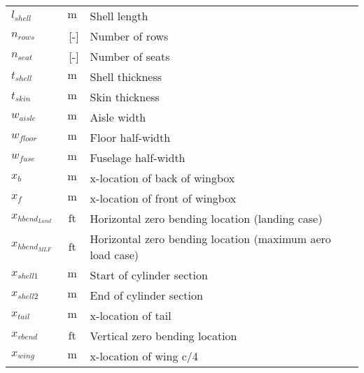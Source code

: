 \documentclass[12pt]{article}
\begin{document}
{\begin{supertabular}{lcl}
$l_{shell}$ & $~\mathrm{m}$ & Shell length \\
$n_{rows}$ & $ $~[-]$ $ & Number of rows \\
$n_{seat}$ & $ $~[-]$ $ & Number of seats \\
$t_{shell}$ & $~\mathrm{m}$ & Shell thickness \\
$t_{skin}$ & $~\mathrm{m}$ & Skin thickness \\
$w_{aisle}$ & $~\mathrm{m}$ & Aisle width \\
$w_{floor}$ & $~\mathrm{m}$ & Floor half-width \\
$w_{fuse}$ & $~\mathrm{m}$ & Fuselage half-width \\
$x_b$ & $~\mathrm{m}$ & x-location of back of wingbox \\
$x_f$ & $~\mathrm{m}$ & x-location of front of wingbox \\
$x_{hbend_{Land}}$ & $~\mathrm{ft}$ & Horizontal zero bending location (landing case) \\
$x_{hbend_{MLF}}$ & $~\mathrm{ft}$ & Horizontal zero bending location (maximum aero load case) \\
$x_{shell1}$ & $~\mathrm{m}$ & Start of cylinder section \\
$x_{shell2}$ & $~\mathrm{m}$ & End of cylinder section \\
$x_{tail}$ & $~\mathrm{m}$ & x-location of tail \\
$x_{vbend}$ & $~\mathrm{ft}$ & Vertical zero bending location \\
$x_{wing}$ & $~\mathrm{m}$ & x-location of wing c/4 \\
\bottomrule
\end{supertabular}}
\end{document}
